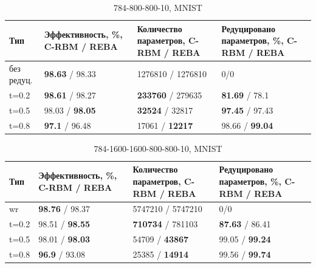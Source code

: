\begin{table} [!h]
  \small
  \caption{784-800-800-10, MNIST}\label{table:mnist_1}
\centering
\begin{tabular}{| p{2cm} | p{4cm} | p{4cm} | p{4cm} |}
  \hline
    \textbf{Тип} & \textbf{Эффективность, \%, C-RBM / REBA} & \textbf{Количество параметров, C-RBM / REBA} & \textbf{Редуцировано параметров, \%, C-RBM / REBA}\\
    \hline
    без редуц. & \textbf{98.63} / 98.33 & 1276810 / 1276810 & 0/0\\
    \hline
    t=0.2 & \textbf{98.61} / 98.27 & \textbf{233760} / 279635 & \textbf{81.69} / 78.1\\
    \hline
    t=0.5 & 98.03 / \textbf{98.05} & \textbf{32524} / 32817 & \textbf{97.45} / 97.43\\
    \hline
    t=0.8 & \textbf{97.1} / 96.48 & 17061 / \textbf{12217} & 98.66 / \textbf{99.04}\\
    \hline
\end{tabular}
\end{table}

\begin{table} [!h]
  \small
  \caption{784-1600-1600-800-800-10,  MNIST}\label{table:mnist_2}
\centering
\begin{tabular}{| p{2cm} | p{4cm} | p{4cm} | p{4cm} |}
  \hline
    \textbf{Тип} & \textbf{Эффективность, \%, C-RBM / REBA} & \textbf{Количество параметров, C-RBM / REBA} & \textbf{Редуцировано параметров, \%, C-RBM / REBA}\\
    \hline
    wr & \textbf{98.76} / 98.37 & 5747210 / 5747210 & 0/0\\
    \hline
    t=0.2 & 98.51 / \textbf{98.55} & \textbf{710734} / 781103 & \textbf{87.63} / 86.41\\
    \hline
    t=0.5 & 98.01 / \textbf{98.03} & 54709 / \textbf{43867} & 99.05 / \textbf{99.24}\\
    \hline
    t=0.8 & \textbf{96.9} / 93.08 & 25385 / \textbf{14914} & 99.56 / \textbf{99.74}\\
    \hline
\end{tabular}
\end{table}

